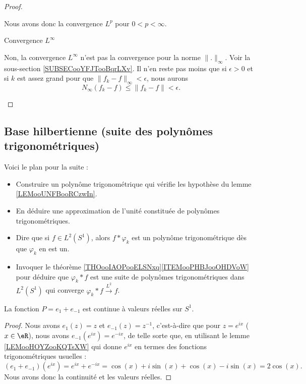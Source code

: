 \begin{proof}
\begin{subproof}
            Nous avons donc la convergence \( L^p\) pour \( 0<p<\infty\).
        \item[Convergence \( L^{\infty}\)]
 
            Non, la convergence \( L^{\infty}\) n'est pas la convergence pour la norme \( \| . \|_{\infty}\). Voir la sous-section \ref{SUBSECooYFJTooBqrLXv}. Il n'en reste pas moins que si \( \epsilon>0\) et si \( k\) est assez grand pour que \( \| f_k-f \|_{\infty}<\epsilon\), nous aurons
            \begin{equation}
                N_{\infty}(f_k-f)\leq \| f_k-f \|<\epsilon.
            \end{equation}
    \end{subproof}
\end{proof}

\subsection{Base hilbertienne (suite des polynômes trigonométriques)}

Voici le plan pour la suite :
\begin{itemize}
    \item Construire un polynôme trigonométrique qui vérifie les hypothèse du lemme \ref{LEMooUNFBooRCzwIn}.
    \item En déduire une approximation de l'unité constituée de polynômes trigonométriques.
    \item Dire que si \( f\in L^2(S^1)\), alors \( f*\varphi_k\) est un polynôme trigonométrique dès que \( \varphi_k\) en est un.
    \item Invoquer le théorème \ref{THOooIAOPooELSNxq}\ref{ITEMooPHBJooOHDVoW} pour déduire que \( \varphi_k*f\) est une suite de polynômes trigonométriques dans \( L^2(S^1)\) qui converge \( \varphi_k*f\stackrel{L^2}{\longrightarrow}f\).
\end{itemize}

\begin{lemma}       \label{LEMooQQILooWlhntZ}
    La fonction \( P=e_1+e_{-1}\) est continue à valeurs réelles sur \( S^1\).
\end{lemma}

\begin{proof}
    Nous avons \( e_1(z)=z\) et \( e_{-1}(z)=z^{-1}\), c'est-à-dire que pour \( z= e^{ix}\) (\( x\in \eR\)), nous avons \( e_{-1}( e^{ix})= e^{-ix}\), de telle sorte que, en utilisant le lemme \ref{LEMooHOYZooKQTsXW} qui donne \(  e^{ix}\) en termes des fonctions trigonométriques usuelles :
    \begin{equation}
        (e_1+e_{-1})( e^{ix})= e^{ix}+ e^{-ix}=\cos(x)+i\sin(x)+\cos(x)-i\sin(x)=2\cos(x).
    \end{equation}
    Nous avons donc la continuité et les valeurs réelles.
\end{proof}

